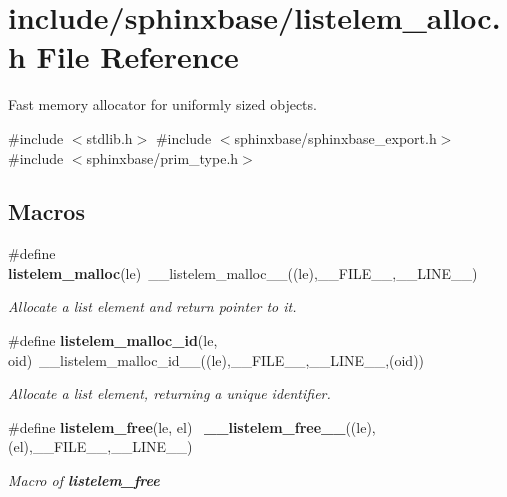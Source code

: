 \section{include/sphinxbase/listelem\+\_\+alloc.h File Reference}
\label{listelem__alloc_8h}


Fast memory allocator for uniformly sized objects.  


{\ttfamily \#include $<$stdlib.\+h$>$}\newline
{\ttfamily \#include $<$sphinxbase/sphinxbase\+\_\+export.\+h$>$}\newline
{\ttfamily \#include $<$sphinxbase/prim\+\_\+type.\+h$>$}\newline
\subsection*{Macros}
\begin{DoxyCompactItemize}
\item 
\mbox{\label{listelem__alloc_8h_ad0c40e65d9cca0d7ec08fcf416b09af2}} 
\#define \textbf{ listelem\+\_\+malloc}(le)~\+\_\+\+\_\+listelem\+\_\+malloc\+\_\+\+\_\+((le),\+\_\+\+\_\+\+F\+I\+L\+E\+\_\+\+\_\+,\+\_\+\+\_\+\+L\+I\+N\+E\+\_\+\+\_\+)
\begin{DoxyCompactList}\small\item\em Allocate a list element and return pointer to it. \end{DoxyCompactList}\item 
\mbox{\label{listelem__alloc_8h_aa9bbb7161aceacdba49b41b189554507}} 
\#define \textbf{ listelem\+\_\+malloc\+\_\+id}(le,  oid)~\+\_\+\+\_\+listelem\+\_\+malloc\+\_\+id\+\_\+\+\_\+((le),\+\_\+\+\_\+\+F\+I\+L\+E\+\_\+\+\_\+,\+\_\+\+\_\+\+L\+I\+N\+E\+\_\+\+\_\+,(oid))
\begin{DoxyCompactList}\small\item\em Allocate a list element, returning a unique identifier. \end{DoxyCompactList}\item 
\mbox{\label{listelem__alloc_8h_a67de661d7ca552347fa6f03005e25d74}} 
\#define \textbf{ listelem\+\_\+free}(le,  el)~\textbf{ \+\_\+\+\_\+listelem\+\_\+free\+\_\+\+\_\+}((le),(el),\+\_\+\+\_\+\+F\+I\+L\+E\+\_\+\+\_\+,\+\_\+\+\_\+\+L\+I\+N\+E\+\_\+\+\_\+)
\begin{DoxyCompactList}\small\item\em Macro of {\bfseries listelem\+\_\+free} \end{DoxyCompactList}\end{DoxyCompactItemize}
